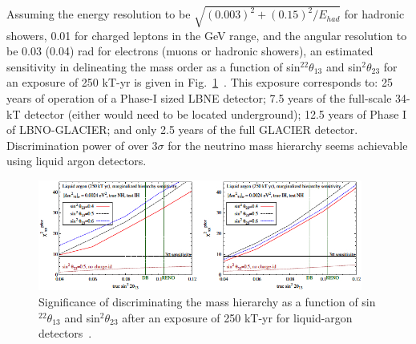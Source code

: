 Assuming the energy resolution to be $\sqrt{(0.003)^2+(0.15)^2/E_{had}}$ 
for hadronic showers, 0.01 for charged leptons in the GeV range, and the angular 
resolution to be 0.03 (0.04) rad for electrons (muons or hadronic
showers), an estimated 
sensitivity in delineating the mass order as a function of
sin$^22\theta_{13}$ and  
sin$^2\theta_{23}$ for an exposure of 250 kT-yr is given in
Fig.~\ref{LAr:sen}~\cite{atm:LAr}. This exposure corresponds to: 25
years of operation of a Phase-I sized LBNE detector; 7.5 years of the full-scale 34-kT detector (either would need to be located underground); 12.5 years of Phase I of
LBNO-GLACIER; and only 2.5 years of the full GLACIER detector. Discrimination power of over
$3\sigma$ for the neutrino mass hierarchy seems achievable using liquid argon detectors. 


\begin{figure}[t]
\begin{center}
\includegraphics[width=0.95\textwidth]{KBL/LAr_sensitivity.jpg}
\caption{Significance of discriminating the mass hierarchy as a function of sin$^22\theta_{13}$ and sin$^2\theta_{23}$ after an exposure of 250 kT-yr for liquid-argon detectors~\cite{atm:LAr}.}
\label{LAr:sen}
\end{center}
\end{figure}





























